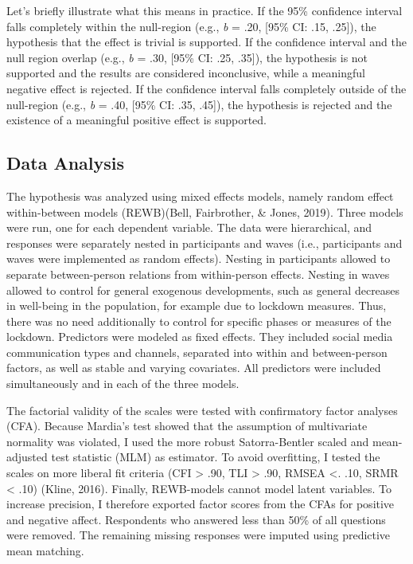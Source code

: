 \documentclass[
  english,
  man,mask,floatsintext]{apa6}
\begin{document}
Let's briefly illustrate what this means in practice.
If the 95\% confidence interval falls completely within the null-region (e.g., \emph{b} = .20, {[}95\% CI: .15, .25{]}), the hypothesis that the effect is trivial is supported.
If the confidence interval and the null region overlap (e.g., \emph{b} = .30, {[}95\% CI: .25, .35{]}), the hypothesis is not supported and the results are considered inconclusive, while a meaningful negative effect is rejected.
If the confidence interval falls completely outside of the null-region (e.g., \emph{b} = .40, {[}95\% CI: .35, .45{]}), the hypothesis is rejected and the existence of a meaningful positive effect is supported.

\hypertarget{data-analysis}{%
\subsection{Data Analysis}\label{data-analysis}}

The hypothesis was analyzed using mixed effects models, namely random effect within-between models (REWB)(Bell, Fairbrother, \& Jones, 2019).
Three models were run, one for each dependent variable.
The data were hierarchical, and responses were separately nested in participants and waves (i.e., participants and waves were implemented as random effects).
Nesting in participants allowed to separate between-person relations from within-person effects.
Nesting in waves allowed to control for general exogenous developments, such as general decreases in well-being in the population, for example due to lockdown measures.
Thus, there was no need additionally to control for specific phases or measures of the lockdown.
Predictors were modeled as fixed effects.
They included social media communication types and channels, separated into within and between-person factors, as well as stable and varying covariates.
All predictors were included simultaneously and in each of the three models.

The factorial validity of the scales were tested with confirmatory factor analyses (CFA).
Because Mardia's test showed that the assumption of multivariate normality was violated, I used the more robust Satorra-Bentler scaled and mean-adjusted test statistic (MLM) as estimator.
To avoid overfitting, I tested the scales on more liberal fit criteria (CFI \textgreater{} .90, TLI \textgreater{} .90, RMSEA \textless. .10, SRMR \textless{} .10) (Kline, 2016).
Finally, REWB-models cannot model latent variables.
To increase precision, I therefore exported factor scores from the CFAs for positive and negative affect.
Respondents who answered less than 50\% of all questions were removed.
The remaining missing responses were imputed using predictive mean matching.
\end{document}
